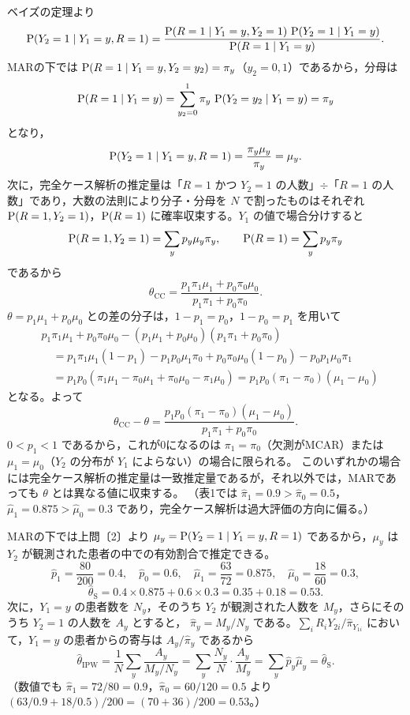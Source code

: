 \documentclass[a4paper,11pt]{ltjsarticle}
\begin{document}
ベイズの定理より
\[
\operatorname{P}(Y_2=1\mid Y_1=y,R=1)=\frac{\operatorname{P}(R=1\mid Y_1=y,Y_2=1)\,\operatorname{P}(Y_2=1\mid Y_1=y)}{\operatorname{P}(R=1\mid Y_1=y)}.
\]
MARの下では $\operatorname{P}(R=1\mid Y_1=y,Y_2=y_2)=\pi_y$（$y_2=0,1$）であるから，分母は
\[
\operatorname{P}(R=1\mid Y_1=y)=\sum_{y_2=0}^{1}\pi_y\,\operatorname{P}(Y_2=y_2\mid Y_1=y)=\pi_y
\]
となり，
\[
\operatorname{P}(Y_2=1\mid Y_1=y,R=1)=\frac{\pi_y\mu_y}{\pi_y}=\mu_y .
\]
次に，完全ケース解析の推定量は「$R=1$ かつ $Y_2=1$ の人数」$\div$「$R=1$ の人数」であり，大数の法則により分子・分母を $N$ で割ったものはそれぞれ
$\operatorname{P}(R=1,Y_2=1)$，$\operatorname{P}(R=1)$ に確率収束する。$Y_1$ の値で場合分けすると
\[
\operatorname{P}(R=1,Y_2=1)=\sum_yp_y\mu_y\pi_y,\qquad \operatorname{P}(R=1)=\sum_yp_y\pi_y
\]
であるから
\[
\theta_{\mathrm{CC}}=\boxed{\frac{p_1\pi_1\mu_1+p_0\pi_0\mu_0}{p_1\pi_1+p_0\pi_0}}.
\]
$\theta=p_1\mu_1+p_0\mu_0$ との差の分子は，$1-p_1=p_0$，$1-p_0=p_1$ を用いて
\begin{align*}
&p_1\pi_1\mu_1+p_0\pi_0\mu_0-(p_1\mu_1+p_0\mu_0)(p_1\pi_1+p_0\pi_0)\\
&\quad=p_1\pi_1\mu_1(1-p_1)-p_1p_0\mu_1\pi_0+p_0\pi_0\mu_0(1-p_0)-p_0p_1\mu_0\pi_1\\
&\quad=p_1p_0(\pi_1\mu_1-\pi_0\mu_1+\pi_0\mu_0-\pi_1\mu_0)=p_1p_0(\pi_1-\pi_0)(\mu_1-\mu_0)
\end{align*}
となる。よって
\[
\theta_{\mathrm{CC}}-\theta=\frac{p_1p_0(\pi_1-\pi_0)(\mu_1-\mu_0)}{p_1\pi_1+p_0\pi_0}.
\]
$0<p_1<1$ であるから，これが0になるのは $\pi_1=\pi_0$（欠測がMCAR）または $\mu_1=\mu_0$（$Y_2$ の分布が $Y_1$ によらない）の場合に限られる。
このいずれかの場合には完全ケース解析の推定量は一致推定量であるが，それ以外では，MARであっても $\theta$ とは異なる値に収束する。
（表1では $\hat\pi_1=0.9>\hat\pi_0=0.5$，$\hat\mu_1=0.875>\hat\mu_0=0.3$ であり，完全ケース解析は過大評価の方向に偏る。）

MARの下では上問〔2〕より $\mu_y=\operatorname{P}(Y_2=1\mid Y_1=y,R=1)$ であるから，$\mu_y$ は $Y_2$ が観測された患者の中での有効割合で推定できる。
\[
\hat p_1=\frac{80}{200}=0.4,\quad\hat p_0=0.6,\quad\hat\mu_1=\frac{63}{72}=0.875,\quad\hat\mu_0=\frac{18}{60}=0.3,
\]
\[
\hat\theta_{\mathrm S}=0.4\times0.875+0.6\times0.3=0.35+0.18=\boxed{0.53}.
\]
次に，$Y_1=y$ の患者数を $N_y$，そのうち $Y_2$ が観測された人数を $M_y$，さらにそのうち $Y_2=1$ の人数を $A_y$ とすると，
$\hat\pi_y=M_y/N_y$ である。$\sum_iR_iY_{2i}/\hat\pi_{Y_{1i}}$ において，$Y_1=y$ の患者からの寄与は $A_y/\hat\pi_y$ であるから
\[
\hat\theta_{\mathrm{IPW}}=\frac1N\sum_{y}\frac{A_y}{M_y/N_y}=\sum_y\frac{N_y}{N}\cdot\frac{A_y}{M_y}=\sum_y\hat p_y\hat\mu_y=\hat\theta_{\mathrm S}.
\]
（数値でも $\hat\pi_1=72/80=0.9$，$\hat\pi_0=60/120=0.5$ より $(63/0.9+18/0.5)/200=(70+36)/200=0.53$。）
\end{document}
